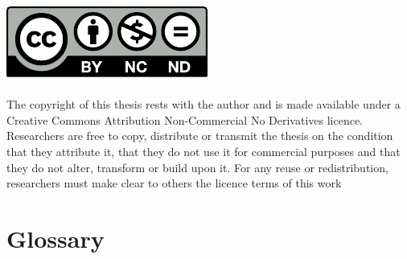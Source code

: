 \documentclass[12pt,a4paper,oneside,fleqn,openright]{book}
\begin{document}

\includegraphics{9_backmatter/doclicense-CC-by-nc-nd.pdf}\\
\doclicenseLongText\\

The copyright of this thesis rests with the author and is made available under a
Creative Commons Attribution Non-Commercial  No Derivatives licence. Researchers
are free to copy,  distribute or transmit the thesis on  the condition that they
attribute it, that they  do not use it for commercial purposes  and that they do
not  alter,  transform or  build  upon  it.  For  any reuse  or  redistribution,
researchers must make clear to others the licence terms of this work

\tableofcontents            %

\cleardoublepage
\listoffigures	%
\cleardoublepage
\listoftables  %
\cleardoublepage
\listofalgorithms
{}
\cleardoublepage
{} %
\cleardoublepage
{} %


\cleardoublepage

\chapter{Glossary}\label{ch:glossary}
\begin{multicols}{2} %
    \begin{footnotesize} %
        \printglossary{}
        \label{nom} %
    \end{footnotesize}
\end{multicols}
\end{document}
